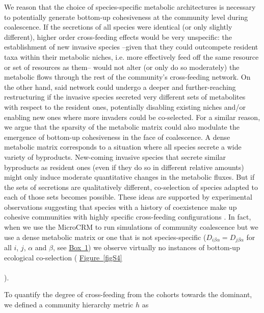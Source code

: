 \documentclass[a4paper,10pt]{article}
\newcommand{\figref}[2][]{%
  \hyperref[{#2}]{%
    Figure~\ref*{#2}%
    \ifx\\#1\\%
    \else
      #1%
    \fi
  }%
}
\begin{document}
We reason that the choice of species-specific metabolic architectures is necessary
to potentially generate bottom-up cohesiveness at the community level during coalescence.
If the secretions of all species were identical (or only slightly different),
higher order cross-feeding effects would be very unspecific:
the establishment of new invasive species
--given that they could outcompete resident taxa within their metabolic niches,
i.e. more effectively feed off the same resource or set of resources as them--
would not alter (or only do so moderately)
the metabolic flows through the rest of the community's cross-feeding network.
On the other hand, said network could undergo a deeper and further-reaching restructuring
if the invasive species secreted very different sets of metabolites with respect to the resident ones,
potentially disabling existing niches and/or enabling new ones
where more invaders could be co-selected.
For a similar reason, we argue that the sparsity of the metabolic matrix could also modulate
the emergence of bottom-up cohesiveness in the face of coalescence.
A dense metabolic matrix corresponds to a situation where all species secrete a wide
variety of byproducts.
New-coming invasive species that secrete similar byproducts as resident ones
(even if they do so in different relative amounts)
might only induce moderate quantitative changes in the metabolic fluxes.
But if the sets of secretions are qualitatively different, co-selection of species adapted to
each of those sets becomes possible.
These ideas are supported by experimental observations
suggesting that species with a history of coexistence make up
cohesive communities with highly specific cross-feeding configurations
\cite{Rosenzweig1994,Goldford2018,Estrela2020}.
In fact, when we use the MicroCRM to run simulations of community coalescence
but we use a dense metabolic matrix or one that is not species-specific
($D_{i\beta\alpha}=D_{j\beta\alpha}$ for all $i$, $j$, $\alpha$ and $\beta$,
see \hyperref[box1]{Box~1})
we observe virtually no instances of bottom-up ecological co-selection
(\figref{figS4}).

To quantify the degree of cross-feeding from the cohorts towards the dominant,
we defined a community hierarchy metric $h$ as
\fi
\end{document}
